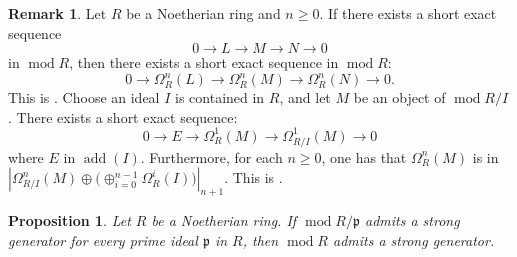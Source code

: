 \documentclass[11pt]{amsart}
\theoremstyle{plain}
\newtheorem{proposition}[theorem]{Proposition}
\theoremstyle{definition}
\newtheorem{remark}[theorem]{Remark}
\numberwithin{equation}{section}
\numberwithin{theorem}{section}
\begin{document}
\begin{remark}\label{rmk:ses_to_syzygy_ses}
    Let $R$ be a Noetherian ring and $n \geq 0$. If there exists a short exact sequence
    \begin{displaymath}
        0 \to L \to M \to N \to 0
    \end{displaymath}
    in $\operatorname{mod}R$, then there exists a short exact sequence in $\operatorname{mod}R$:
    \begin{displaymath}
        0 \to \Omega^n_R (L) \to \Omega^n_R(M) \to \Omega^n_R(N) \to 0.
    \end{displaymath}
    This is \cite[Remark 2.2]{Iyengar/Takahashi:2016}. Choose an ideal $I$ is contained in $ R$, and let $M$ be an object of $ \operatorname{mod}R/I$. There exists a short exact sequence:
    \begin{displaymath}
        0 \to E \to \Omega_R^1 (M) \to \Omega^1_{R/I}(M) \to 0
    \end{displaymath}
    where $E$ in $ \operatorname{add}(I)$. Furthermore, for each $n\geq 0$, one has that $\Omega_R^n (M)$ is in $|\Omega^n_{R/I} (M) \oplus \big( \oplus^{n-1}_{i=0}\Omega_R^i (I)\big)|_{n+1}$. This is \cite[Proposition 5.3]{Dao/Takahashi:2014}.
\end{remark}

\begin{proposition}\label{prop:strong_generation_via_minimal_primes}
    Let $R$ be a Noetherian ring. If $\operatorname{mod}R/\mathfrak{p}$ admits a strong generator for every prime ideal $\mathfrak{p}$ in $R$, then $\operatorname{mod}R$ admits a strong generator.
\end{proposition}
\end{document}
